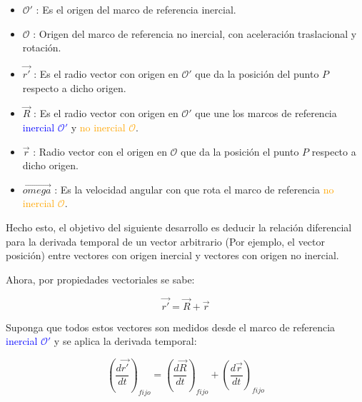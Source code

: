 \documentclass[/home/hernan/Documentos/Apuntes_mecanica_teorica/main.tex]{subfiles}
\begin{document}
	\begin{itemize}
		\item ${\mathcal{O}}'$ : Es el origen del marco de referencia inercial.
		\item $\mathcal{O}$ : Origen del marco de referencia no inercial, con aceleración traslacional y rotación.
		\item $\vec{{r}'}$ : Es el radio vector con origen en ${\mathcal{O}}'$ que da la posición del punto $P$ respecto a dicho origen.
		\item $\vec{R}$ : Es el radio vector con origen en ${\mathcal{O}}'$ que une los marcos de referencia  \textcolor{blue}{inercial ${\mathcal{O}}'$} y \textcolor{orange}{no inercial $\mathcal{O}$}.
		\item $\vec{r}$ :  Radio vector con el origen en $\mathcal{O}$ que da la posición el punto $P$ respecto a dicho origen.
		\item $\vec{omega}$ : Es la velocidad angular con que rota el marco de referencia  \textcolor{orange}{no inercial $\mathcal{O}$}.
	\end{itemize}

	Hecho esto, el objetivo del siguiente desarrollo es deducir la relación diferencial para la derivada temporal de un vector arbitrario (Por ejemplo, el vector posición) entre vectores con origen inercial y vectores con origen no inercial.

	Ahora, por propiedades vectoriales se sabe:

	\begin{equation}
		\vec{{r}'} = \vec{R} + \vec{r}
		\label{eq: posiciondosmarcos}
	\end{equation}

	Suponga que todos estos vectores son medidos desde el marco de referencia  \textcolor{blue}{inercial ${\mathcal{O}}'$} y se aplica la derivada temporal:

	\begin{equation}
		\left( \frac{d \vec{{r}'}}{dt} \right)_{fijo} = \left( \frac{d \vec{R}}{dt} \right)_{fijo} + \left( \frac{d \vec{r}}{dt} \right)_{fijo}
		\label{eq: velocidaddosmarcos}
	\end{equation} 
\end{document}

